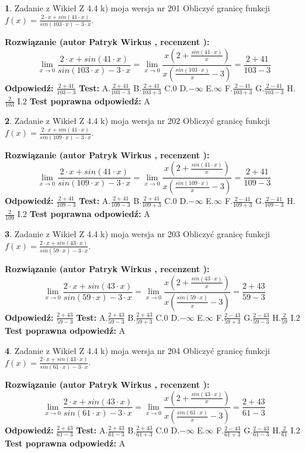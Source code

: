 \documentclass[12pt, a4paper]{article}
\theoremstyle{definition} %
\newtheorem{zad}{}
\newcommand{\zadStart}[1]{\begin{zad}#1\newline}
\newcommand{\zadStop}{\end{zad}}
\newcommand{\rozwStart}[2]{\noindent \textbf{Rozwiązanie (autor #1 , recenzent #2): }\newline}
\newcommand{\rozwStop}{\newline}
\newcommand{\odpStart}{\noindent \textbf{Odpowiedź:}\newline}
\newcommand{\odpStop}{\newline}
\newcommand{\testStart}{\noindent \textbf{Test:}\newline}
\newcommand{\testStop}{\newline}
\newcommand{\kluczStart}{\noindent \textbf{Test poprawna odpowiedź:}\newline}
\newcommand{\kluczStop}{\newline}
\begin{document}
\zadStart{Zadanie z Wikieł Z 4.4 k) moja wersja nr 201}
Obliczyć granicę funkcji $f(x)=\frac{2\cdot x +sin(41\cdot x)}{sin(103\cdot x) -3\cdot x}$.
\zadStop
\rozwStart{Patryk Wirkus}{}
$$\lim\limits_{x\to 0}\frac{2\cdot x +sin(41\cdot x)}{sin(103\cdot x) -3\cdot x}
=\lim\limits_{x\to 0}\frac{x(2+\frac{sin(41\cdot x)}{x})}{x(\frac{sin(103\cdot x)}{x}-3)}
=\frac{2+41}{103-3}$$
\rozwStop
\odpStart
$\frac{2+41}{103-3}$
\odpStop
\testStart
A.$\frac{2+41}{103-3}$
B.$\frac{2+41}{103+3}$
C.$0$
D.$-\infty$
E.$\infty$
F.$\frac{2-41}{103+3}$
G.$\frac{2-41}{103-3}$
H.$\frac{2}{103}$
I.$2$
\testStop
\kluczStart
A
\kluczStop



\zadStart{Zadanie z Wikieł Z 4.4 k) moja wersja nr 202}
Obliczyć granicę funkcji $f(x)=\frac{2\cdot x +sin(41\cdot x)}{sin(109\cdot x) -3\cdot x}$.
\zadStop
\rozwStart{Patryk Wirkus}{}
$$\lim\limits_{x\to 0}\frac{2\cdot x +sin(41\cdot x)}{sin(109\cdot x) -3\cdot x}
=\lim\limits_{x\to 0}\frac{x(2+\frac{sin(41\cdot x)}{x})}{x(\frac{sin(109\cdot x)}{x}-3)}
=\frac{2+41}{109-3}$$
\rozwStop
\odpStart
$\frac{2+41}{109-3}$
\odpStop
\testStart
A.$\frac{2+41}{109-3}$
B.$\frac{2+41}{109+3}$
C.$0$
D.$-\infty$
E.$\infty$
F.$\frac{2-41}{109+3}$
G.$\frac{2-41}{109-3}$
H.$\frac{2}{109}$
I.$2$
\testStop
\kluczStart
A
\kluczStop



\zadStart{Zadanie z Wikieł Z 4.4 k) moja wersja nr 203}
Obliczyć granicę funkcji $f(x)=\frac{2\cdot x +sin(43\cdot x)}{sin(59\cdot x) -3\cdot x}$.
\zadStop
\rozwStart{Patryk Wirkus}{}
$$\lim\limits_{x\to 0}\frac{2\cdot x +sin(43\cdot x)}{sin(59\cdot x) -3\cdot x}
=\lim\limits_{x\to 0}\frac{x(2+\frac{sin(43\cdot x)}{x})}{x(\frac{sin(59\cdot x)}{x}-3)}
=\frac{2+43}{59-3}$$
\rozwStop
\odpStart
$\frac{2+43}{59-3}$
\odpStop
\testStart
A.$\frac{2+43}{59-3}$
B.$\frac{2+43}{59+3}$
C.$0$
D.$-\infty$
E.$\infty$
F.$\frac{2-43}{59+3}$
G.$\frac{2-43}{59-3}$
H.$\frac{2}{59}$
I.$2$
\testStop
\kluczStart
A
\kluczStop



\zadStart{Zadanie z Wikieł Z 4.4 k) moja wersja nr 204}
Obliczyć granicę funkcji $f(x)=\frac{2\cdot x +sin(43\cdot x)}{sin(61\cdot x) -3\cdot x}$.
\zadStop
\rozwStart{Patryk Wirkus}{}
$$\lim\limits_{x\to 0}\frac{2\cdot x +sin(43\cdot x)}{sin(61\cdot x) -3\cdot x}
=\lim\limits_{x\to 0}\frac{x(2+\frac{sin(43\cdot x)}{x})}{x(\frac{sin(61\cdot x)}{x}-3)}
=\frac{2+43}{61-3}$$
\rozwStop
\odpStart
$\frac{2+43}{61-3}$
\odpStop
\testStart
A.$\frac{2+43}{61-3}$
B.$\frac{2+43}{61+3}$
C.$0$
D.$-\infty$
E.$\infty$
F.$\frac{2-43}{61+3}$
G.$\frac{2-43}{61-3}$
H.$\frac{2}{61}$
I.$2$
\testStop
\kluczStart
A
\kluczStop
\end{document}
